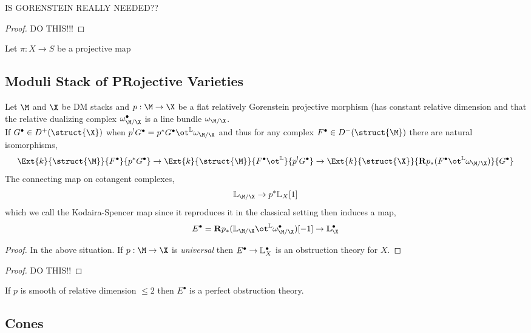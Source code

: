 \documentclass[12pt]{article}
\begin{document}
\begin{rmk}
IS GORENSTEIN REALLY NEEDED??
\end{rmk}

\begin{proof}
DO THIS!!!
\end{proof}

\begin{lemma}
Let $\pi : X \to S$ be a projective map 
\end{lemma}

\subsection{Moduli Stack of PRojective Varieties}

Let $\M$ and $\X$ be DM stacks and $p : \M \to \X$ be a flat relatively Gorenstein projective morphism (has constant relative dimension and that the relative dualizing complex $\omega_{\M/\X}^{\bullet}$ is a line bundle $\omega_{\M/\X}$. 
\bigskip\\
If $G^\bullet \in D^+(\struct{\X})$ when $p^! G^\bullet = p^* G^\bullet \ot^{\LL} \omega_{\M/\X}$ and thus for any complex $F^\bullet \in D^{-}(\struct{\M})$ there are natural isomorphisms,
\[ \Ext{k}{\struct{\M}}{F^\bullet}{p^* G^\bullet} \to \Ext{k}{\struct{\M}}{F^\bullet \ot^{\LL}}{p^! G^\bullet} \to \Ext{k}{\struct{\X}}{ \R p_* (F^\bullet \ot^{\LL} \omega_{\M/\X})}{G^\bullet} \]
The connecting map on cotangent complexes,
\[ \LL_{\M/\X} \to p^* \LL_{X}[1] \]
which we call the Kodaira-Spencer map since it reproduces it in the classical setting then induces a map,
\[ E^\bullet = \R p_* (\LL_{\M/\X} \ot^{\LL} \omega_{\M/\X}^\bullet)[-1] \to \LL_{\X}^\bullet \]

\begin{proof}
In the above situation. If $p : \M \to \X$ is \textit{universal} then $E^\bullet \to \mathbb{L}^\bullet_X$ is an obstruction theory for $X$.
\end{proof}

\begin{proof}
DO THIS!!
\end{proof}

\begin{cor}
If $p$ is smooth of relative dimension $\le 2$ then $E^\bullet$ is a perfect obstruction theory. 
\end{cor}
\subsection{Cones}
\end{document}
